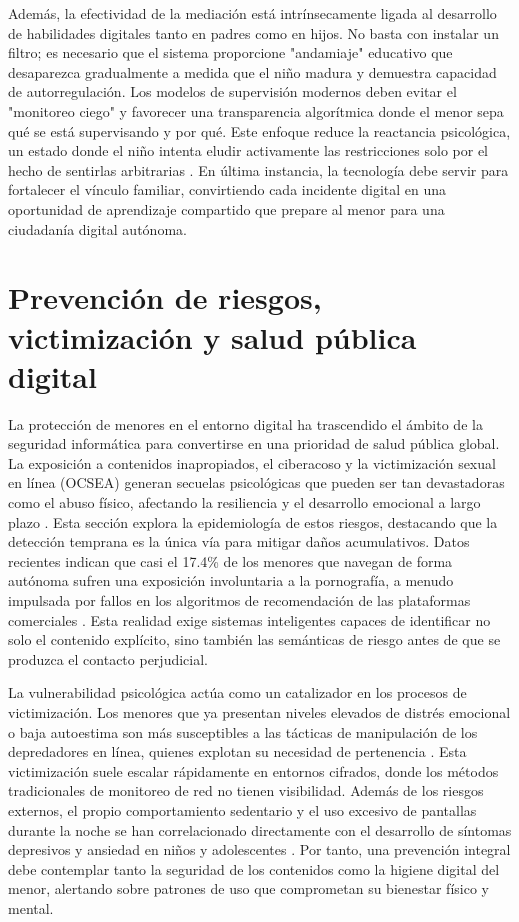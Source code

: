 Además, la efectividad de la mediación está intrínsecamente ligada al desarrollo de habilidades digitales tanto en padres como en hijos. No basta con instalar un filtro; es necesario que el sistema proporcione "andamiaje" educativo que desaparezca gradualmente a medida que el niño madura y demuestra capacidad de autorregulación. Los modelos de supervisión modernos deben evitar el "monitoreo ciego" y favorecer una transparencia algorítmica donde el menor sepa qué se está supervisando y por qué. Este enfoque reduce la reactancia psicológica, un estado donde el niño intenta eludir activamente las restricciones solo por el hecho de sentirlas arbitrarias \cite{ayyash_cybersecurity_2024}. En última instancia, la tecnología debe servir para fortalecer el vínculo familiar, convirtiendo cada incidente digital en una oportunidad de aprendizaje compartido que prepare al menor para una ciudadanía digital autónoma.


\section{Prevención de riesgos, victimización y salud pública digital}

La protección de menores en el entorno digital ha trascendido el ámbito de la seguridad informática para convertirse en una prioridad de salud pública global. La exposición a contenidos inapropiados, el ciberacoso y la victimización sexual en línea (OCSEA) generan secuelas psicológicas que pueden ser tan devastadoras como el abuso físico, afectando la resiliencia y el desarrollo emocional a largo plazo \cite{page_psychological_2025}. Esta sección explora la epidemiología de estos riesgos, destacando que la detección temprana es la única vía para mitigar daños acumulativos. Datos recientes indican que casi el 17.4\% de los menores que navegan de forma autónoma sufren una exposición involuntaria a la pornografía, a menudo impulsada por fallos en los algoritmos de recomendación de las plataformas comerciales \cite{yusuf_lets_2023}. Esta realidad exige sistemas inteligentes capaces de identificar no solo el contenido explícito, sino también las semánticas de riesgo antes de que se produzca el contacto perjudicial.

La vulnerabilidad psicológica actúa como un catalizador en los procesos de victimización. Los menores que ya presentan niveles elevados de distrés emocional o baja autoestima son más susceptibles a las tácticas de manipulación de los depredadores en línea, quienes explotan su necesidad de pertenencia \cite{el-asam_psychological_2022}. Esta victimización suele escalar rápidamente en entornos cifrados, donde los métodos tradicionales de monitoreo de red no tienen visibilidad. Además de los riesgos externos, el propio comportamiento sedentario y el uso excesivo de pantallas durante la noche se han correlacionado directamente con el desarrollo de síntomas depresivos y ansiedad en niños y adolescentes \cite{soriano-molina_association_2025}. Por tanto, una prevención integral debe contemplar tanto la seguridad de los contenidos como la higiene digital del menor, alertando sobre patrones de uso que comprometan su bienestar físico y mental.

